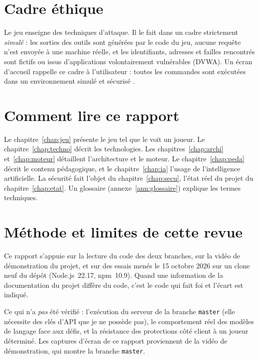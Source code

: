 \documentclass[11pt,a4paper]{report}
\newcommand{\code}[1]{\texttt{\nolinkurl{#1}}}
\begin{document}
\section{Cadre \'ethique}

Le jeu enseigne des techniques d'attaque. Il le fait dans un cadre strictement
\emph{simul\'e} : les sorties des outils sont g\'en\'er\'ees par le code du jeu, aucune
requ\^ete n'est envoy\'ee \`a une machine r\'eelle, et les identifiants, adresses et
failles rencontr\'es sont fictifs ou issus d'applications volontairement vuln\'erables
(DVWA). Un \'ecran d'accueil rappelle ce cadre \`a l'utilisateur : \og toutes les
commandes sont ex\'ecut\'ees dans un environnement simul\'e et s\'ecuris\'e \fg.

\section{Comment lire ce rapport}

Le chapitre~\ref{chap:jeu} pr\'esente le jeu tel que le voit un joueur. Le
chapitre~\ref{chap:techno} d\'ecrit les technologies. Les chapitres~\ref{chap:archi}
et~\ref{chap:moteur} d\'etaillent l'architecture et le moteur. Le
chapitre~\ref{chap:peda} d\'ecrit le contenu p\'edagogique, et le
chapitre~\ref{chap:ia} l'usage de l'intelligence artificielle. La s\'ecurit\'e fait
l'objet du chapitre~\ref{chap:secu}, l'\'etat r\'eel du projet du
chapitre~\ref{chap:etat}. Un glossaire (annexe~\ref{ann:glossaire}) explique les
termes techniques.

\section{M\'ethode et limites de cette revue}

Ce rapport s'appuie sur la lecture du code des deux branches, sur la vid\'eo de
d\'emonstration du projet, et sur des essais men\'es le 15 octobre 2026 sur un clone
neuf du d\'ep\^ot (Node.js~22.17, npm~10.9). Quand une information de la documentation
du projet diff\`ere du code, c'est le code qui fait foi et l'\'ecart est indiqu\'e.

Ce qui n'a \emph{pas} \'et\'e v\'erifi\'e : l'ex\'ecution du serveur de la branche
\code{master} (elle n\'ecessite des cl\'es d'API que je ne poss\`ede pas), le
comportement r\'eel des mod\`eles de langage face aux d\'efis, et la r\'esistance des
protections c\^ot\'e client \`a un joueur d\'etermin\'e. Les captures d'\'ecran de ce rapport
proviennent de la vid\'eo de d\'emonstration, qui montre la branche \code{master}.
\end{document}
